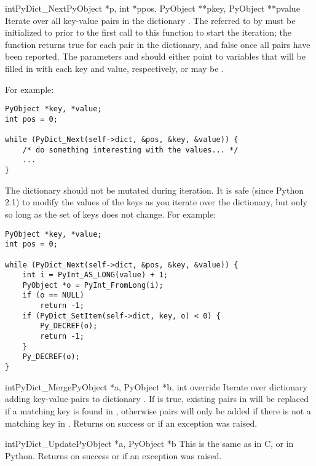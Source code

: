 \documentclass{manual}
\begin{document}
\begin{cfuncdesc}{int}{PyDict_Next}{PyObject *p, int *ppos,
                                    PyObject **pkey, PyObject **pvalue}
Iterate over all key-value pairs in the dictionary .  The
 referred to by  must be initialized to 
prior to the first call to this function to start the iteration; the
function returns true for each pair in the dictionary, and false once
all pairs have been reported.  The parameters  and
 should either point to  variables that
will be filled in with each key and value, respectively, or may be
\NULL.

For example:

\begin{verbatim}
PyObject *key, *value;
int pos = 0;

while (PyDict_Next(self->dict, &pos, &key, &value)) {
    /* do something interesting with the values... */
    ...
}
\end{verbatim}

The dictionary  should not be mutated during iteration.  It is
safe (since Python 2.1) to modify the values of the keys as you
iterate over the dictionary, but only so long as the set of keys does
not change.  For example:

\begin{verbatim}
PyObject *key, *value;
int pos = 0;

while (PyDict_Next(self->dict, &pos, &key, &value)) {
    int i = PyInt_AS_LONG(value) + 1;
    PyObject *o = PyInt_FromLong(i);
    if (o == NULL)
        return -1;
    if (PyDict_SetItem(self->dict, key, o) < 0) {
        Py_DECREF(o);
        return -1;
    }
    Py_DECREF(o);
}
\end{verbatim}
\end{cfuncdesc}

\begin{cfuncdesc}{int}{PyDict_Merge}{PyObject *a, PyObject *b, int override}
Iterate over dictionary  adding key-value pairs to dictionary
.  If  is true, existing pairs in  will be
replaced if a matching key is found in , otherwise pairs will
only be added if there is not a matching key in .  Returns
 on success or  if an exception was raised.
\end{cfuncdesc}

\begin{cfuncdesc}{int}{PyDict_Update}{PyObject *a, PyObject *b}
This is the same as  in C, or
 in Python.  Returns  on success
or  if an exception was raised.
\end{cfuncdesc}
\end{document}
